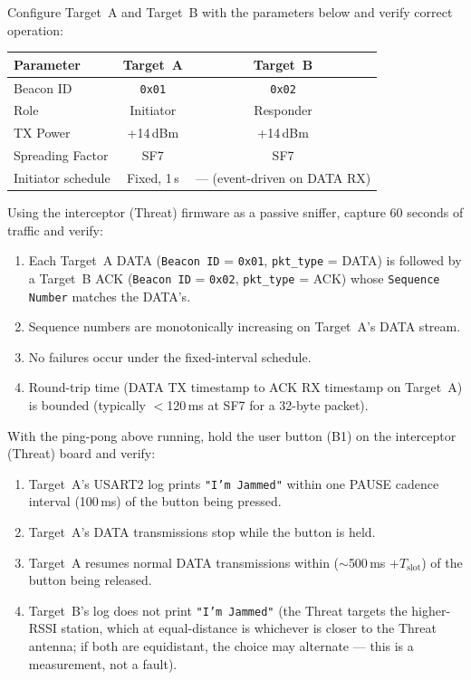 \documentclass[11pt,letterpaper]{article}
\begin{document}
	\begin{tcolorbox}[infobox={Exercise: Bidirectional Ping-Pong Operation}]
		Configure Target~A and Target~B with the parameters below and verify correct operation:

		\medskip
		\begin{tabular}{l c c}
			\toprule
			\textbf{Parameter} & \textbf{Target~A} & \textbf{Target~B} \\
			\midrule
			Beacon ID            & \texttt{0x01} & \texttt{0x02} \\
			Role                 & Initiator     & Responder \\
			TX Power             & +14\,dBm      & +14\,dBm \\
			Spreading Factor     & SF7           & SF7 \\
			Initiator schedule   & Fixed, 1\,s   & --- (event-driven on DATA RX) \\
			\bottomrule
		\end{tabular}

		\medskip
		Using the interceptor (Threat) firmware as a passive sniffer, capture 60 seconds of traffic and verify:
		\begin{enumerate}
			\item Each Target~A DATA (\texttt{Beacon ID} = \texttt{0x01}, \texttt{pkt\_type} = DATA) is followed by a Target~B ACK (\texttt{Beacon ID} = \texttt{0x02}, \texttt{pkt\_type} = ACK) whose \texttt{Sequence Number} matches the DATA's.
			\item Sequence numbers are monotonically increasing on Target~A's DATA stream.
			\item No \CRC{} failures occur under the fixed-interval schedule.
			\item Round-trip time (DATA TX timestamp to ACK RX timestamp on Target~A) is bounded (typically $<$120\,ms at SF7 for a 32-byte packet).
		\end{enumerate}
	\end{tcolorbox}

	\begin{tcolorbox}[infobox={Exercise: PAUSE Behavioral Response}]
		With the ping-pong above running, hold the user button (B1) on the interceptor (Threat) board and verify:
		\begin{enumerate}
			\item Target~A's USART2 log prints \texttt{"I'm Jammed"} within one PAUSE cadence interval (100\,ms) of the button being pressed.
			\item Target~A's DATA transmissions stop while the button is held.
			\item Target~A resumes normal DATA transmissions within ($\sim$500\,ms +$T_{\mathrm{slot}}$) of the button being released.
			\item Target~B's log does not print \texttt{"I'm Jammed"} (the Threat targets the higher-RSSI station, which at equal-distance is whichever is closer to the Threat antenna; if both are equidistant, the choice may alternate --- this is a measurement, not a fault).
		\end{enumerate}
	\end{tcolorbox}
\end{document}
